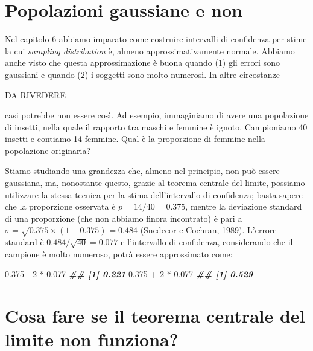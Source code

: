 \documentclass[
  12pt,
]{book}
\newenvironment{Shaded}{\begin{snugshade}}{\end{snugshade}}
\newcommand{\DecValTok}[1]{\textcolor[rgb]{0.00,0.00,0.81}{#1}}
\newcommand{\DocumentationTok}[1]{\textcolor[rgb]{0.56,0.35,0.01}{\textbf{\textit{#1}}}}
\newcommand{\FloatTok}[1]{\textcolor[rgb]{0.00,0.00,0.81}{#1}}
\newcommand{\SpecialCharTok}[1]{\textcolor[rgb]{0.00,0.00,0.00}{#1}}
\begin{document}
\hypertarget{popolazioni-gaussiane-e-non}{%
\section{Popolazioni gaussiane e non}\label{popolazioni-gaussiane-e-non}}

Nel capitolo 6 abbiamo imparato come costruire intervalli di confidenza per stime la cui \emph{sampling distribution} è, almeno approssimativamente normale. Abbiamo anche visto che questa approssimazione è buona quando (1) gli errori sono gaussiani e quando (2) i soggetti sono molto numerosi. In altre circostanze

DA RIVEDERE

casi potrebbe non essere così. Ad esempio, immaginiamo di avere una popolazione di insetti, nella quale il rapporto tra maschi e femmine è ignoto. Campioniamo 40 insetti e contiamo 14 femmine. Qual è la proporzione di femmine nella popolazione originaria?

Stiamo studiando una grandezza che, almeno nel principio, non può essere gaussiana, ma, nonostante questo, grazie al teorema centrale del limite, possiamo utilizzare la stessa tecnica per la stima dell'intervallo di confidenza; basta sapere che la proporzione osservata è \(p = 14/40 = 0.375\), mentre la deviazione standard di una proporzione (che non abbiamo finora incontrato) è pari a \(\sigma = \sqrt{0.375 \times (1 - 0.375)} = 0.484\) (Snedecor e Cochran, 1989). L'errore standard è \(0.484 / \sqrt{40} = 0.077\) e l'intervallo di confidenza, considerando che il campione è molto numeroso, potrà essere approssimato come:

\begin{Shaded}
\begin{Highlighting}[]
\FloatTok{0.375} \SpecialCharTok{{-}} \DecValTok{2} \SpecialCharTok{*} \FloatTok{0.077}
\DocumentationTok{\#\# [1] 0.221}
\FloatTok{0.375} \SpecialCharTok{+} \DecValTok{2} \SpecialCharTok{*} \FloatTok{0.077}
\DocumentationTok{\#\# [1] 0.529}
\end{Highlighting}
\end{Shaded}

\hypertarget{cosa-fare-se-il-teorema-centrale-del-limite-non-funziona}{%
\section{Cosa fare se il teorema centrale del limite non funziona?}\label{cosa-fare-se-il-teorema-centrale-del-limite-non-funziona}}
\end{document}
